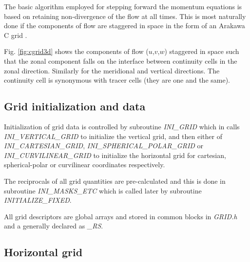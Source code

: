 The basic algorithm employed for stepping forward the momentum
equations is based on retaining non-divergence of the flow at all
times. This is most naturally done if the components of flow are
staggered in space in the form of an Arakawa C grid \cite{arakawa:77}.

Fig. \ref{fig:cgrid3d} shows the components of flow ($u$,$v$,$w$)
staggered in space such that the zonal component falls on the
interface between continuity cells in the zonal direction. Similarly
for the meridional and vertical directions.  The continuity cell is
synonymous with tracer cells (they are one and the same).



\subsection{Grid initialization and data}

Initialization of grid data is controlled by subroutine {\em
INI\_GRID} which in calls {\em INI\_VERTICAL\_GRID} to initialize the
vertical grid, and then either of {\em INI\_CARTESIAN\_GRID}, {\em
INI\_SPHERICAL\_POLAR\_GRID} or {\em INI\_CURV\-ILINEAR\_GRID} to
initialize the horizontal grid for cartesian, spherical-polar or
curvilinear coordinates respectively.

The reciprocals of all grid quantities are pre-calculated and this is
done in subroutine {\em INI\_MASKS\_ETC} which is called later by
subroutine {\em INITIALIZE\_FIXED}.

All grid descriptors are global arrays and stored in common blocks in
{\em GRID.h} and a generally declared as {\em \_RS}.



\subsection{Horizontal grid}
\label{sec:spatial_discrete_horizontal_grid}


